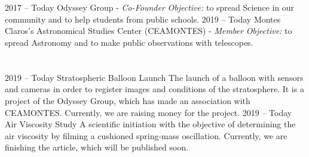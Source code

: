 \documentclass{cv}
\begin{document}
    \section*{}
        \begin{entrylist}
            \entry
                {2017 -- Today}
                {Odyssey Group - {\textit{Co-Founder}}}
                {}
                {\textit{Objective:} to spread Science in our community and to help students from public schools.}
            \entry
                {2019 -- Today}
                {Montes Claros's Astronomical Studies Center (CEAMONTES) - {\textit{Member}}}
                {}
                {\textit{Objective:} to spread Astronomy and to make public observations with telescopes.}
        \end{entrylist}
    
    \section*{}
        \begin{entrylist}
            \entry
                {2019 -- Today}
                {Stratospheric Balloon Launch}
                {}
                {The launch of a balloon with sensors and cameras in order to register images and conditions of the stratosphere. It is a project of the Odyssey Group, which has made an association with CEAMONTES. Currently, we are raising money for the project.}
            \entry
                {2019 -- Today}
                {Air Viscosity Study}
                {}
                {A scientific initiation with the objective of determining the air viscosity by filming a cushioned spring-mass oscillation. Currently, we are finishing the article, which will be published soon.}
        \end{entrylist}
    
\end{document}
